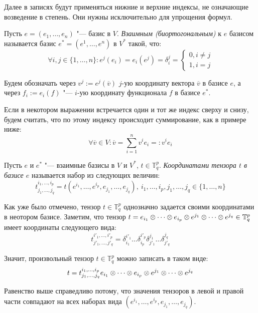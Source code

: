 \begin{note}
	Далее в записях будут применяться нижние и верхние индексы, не означающие возведение в степень. Они нужны исключительно для упрощения формул.
\end{note}

\begin{definition}
	Пусть $e = (e_1, \dots, e_n)$ "--- базис в $V$. \textit{Взаимным (биортогональным)} к $e$ базисом называется базис $e^* = (e^1, \dots, e^n)$ в $V^*$ такой, что:
	\[\forall i, j \in \{1, \dotsc, n\}: e^j(e_i) = e_i(e^j) = \delta^j_i = \left\{\begin{aligned}
	0, i \ne j\\
	1, i = j
	\end{aligned}\right.\]
	
	Будем обозначать через $v^j := e^j(\overline{v})$ $j$-ую координату вектора $\overline{v}$ в базисе $e$, а через $f_i := e_i(f)$ "--- $i$-ую координату функционала $f$ в базисе $e^*$.
\end{definition}

\begin{note}
	Если в некотором выражении встречается один и тот же индекс сверху и снизу, будем считать, что по этому индексу происходит суммирование, как в примере ниже:
	\[\forall \overline{v} \in V: \overline{v} = \sum\limits_{i = 1}^nv^ie_i =: v^ie_i\] 
\end{note}

\begin{definition}
	Пусть $e$ и $e^*$ "--- взаимные базисы в $V$ и $V^*$, $t \in \mathbb{T}^p_q$. \textit{Координатами тензора $t$ в базисе $e$} называется набор из следующих величин:
	\[t^{i_1, \dots, i_p}_{j_1, \dots, j_q} = t(e^{i_1}, \dots, e^{i_p}, e_{j_1}, \dots, e_{j_q}),~i_1, \dots, i_p, j_1, \dots, j_q \in \{1, \dots, n\}\]
\end{definition}

\begin{note}
	Как уже было отмечено, тензор $t \in \mathbb T^p_q$ однозначно задается своими координатами в неотором базисе. Заметим, что тензор $t = e_{i_1} \otimes \dots \otimes e_{i_p} \otimes e^{j_1} \hm{\otimes} \dots \otimes e^{j_q} \hm{\in} \mathbb{T}^p_q$ имеет координаты следующего вида:
	\[t^{i'_1, \dots, i'_p}_{j'_1, \dots, j'_q} = \delta_{i_1}^{i'_1}\dots\delta_{i_p}^{i'_p}\delta_{j'_1}^{j_1}\dots\delta_{j'_q}^{j_q}\]
	
	Значит, произвольный тензор $t \in \mathbb{T}^p_q$ можно записать в таком виде:
	\[t = t^{i_1, \dots, i_p}_{j_1, \dots, j_q}e_{i_1} \otimes \dots \otimes e_{i_p} \otimes e^{j_1} \hm{\otimes} \dots \otimes e^{j_q}\]
	
	Равенство выше справедливо потому, что значения тензоров в левой и правой части совпадают на всех наборах вида $(e^{i_1}, \dots, e^{i_p}, e_{j_1}, \dots, e_{j_q})$.
\end{note}
	
